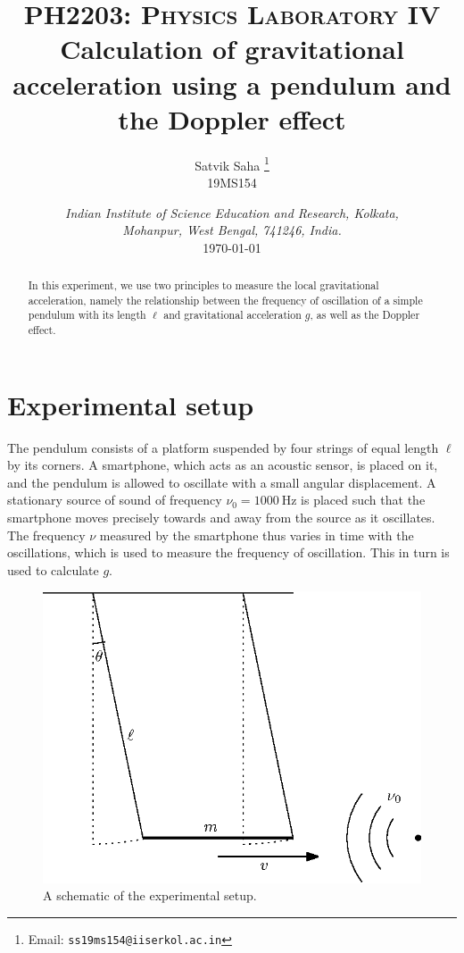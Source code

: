 \documentclass[11pt]{article}
\title{
    \Large\textsc{PH2203: Physics Laboratory IV} \\
    \vspace{5pt}
    \LARGE{Calculation of gravitational acceleration using a pendulum and the
    Doppler effect}
}
\author{
    \large Satvik Saha%
    \thanks{Email: \tt ss19ms154@iiserkol.ac.in}
    \\\textsc{\small 19MS154}
}
\date{\normalsize
    \textit{Indian Institute of Science Education and Research, Kolkata, \\
    Mohanpur, West Bengal, 741246, India.} \\
    \vspace{10pt}
    \today
}
\begin{document}
    \maketitle

    \begin{abstract}
        In this experiment, we use two principles to measure the local gravitational
        acceleration, namely the relationship between the frequency of oscillation of a
        simple pendulum with its length $\ell$ and gravitational acceleration $g$,
        as well as the Doppler effect.
    \end{abstract}

    \section{Experimental setup}
    The pendulum consists of a platform suspended by four strings of equal length
    $\ell$ by its corners. A smartphone, which acts as an acoustic sensor, is placed
    on it, and the pendulum is allowed to oscillate with a small angular
    displacement. A stationary source of sound of frequency $\nu_0 = \SI{1000}{\Hz}$ is
    placed such that the smartphone moves precisely towards and away from the source
    as it oscillates. The frequency $\nu$ measured by the smartphone thus varies
    in time with the oscillations, which is used to measure the frequency of
    oscillation. This in turn is used to calculate $g$.
    
    \begin{figure}[H]
    \begin{center}
        \includegraphics[scale=1.0]{./pendulum.eps}
    \end{center}
    \caption{A schematic of the experimental setup.}
    \label{fig:setup}
    \end{figure}
\end{document}

